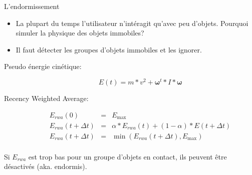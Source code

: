 \begin{frame}{L'endormissement}
    \begin{itemize}
        \item La plupart du temps l’utilisateur n’intéragit qu’avec
            peu d’objets. Pourquoi simuler la physique des objets immobiles?
        \pause
        \item Il faut détecter les groupes d’objets immobiles et les
            ignorer.
    \end{itemize}
        \pause
    \begin{description}
        \item[Pseudo énergie cinétique:]\mbox{}
            \[
                E(t) = m * v^2 + \boldsymbol\omega^t * I * \boldsymbol\omega
            \]
        \pause
    \item[Recency Weighted Average:]\mbox{}
        \[
            \begin{array}{lcl}
                E_{rwa}(0) & = & E_{\text{max}}\\
                E_{rwa}(t + \Delta t) & = & \alpha * E_{rwa}(t) + (1 - \alpha) * E(t + \Delta t)\\
                E_{rwa}(t + \Delta t) & = & \min(E_{rwa}(t + \Delta t), E_{\text{max}})\\
            \end{array}
        \]
    \end{description}
    \pause
    Si $E_{rwa}$ est trop bas pour un groupe d’objets en contact, ils peuvent
    être désactivés (aka. endormis).
\end{frame}

